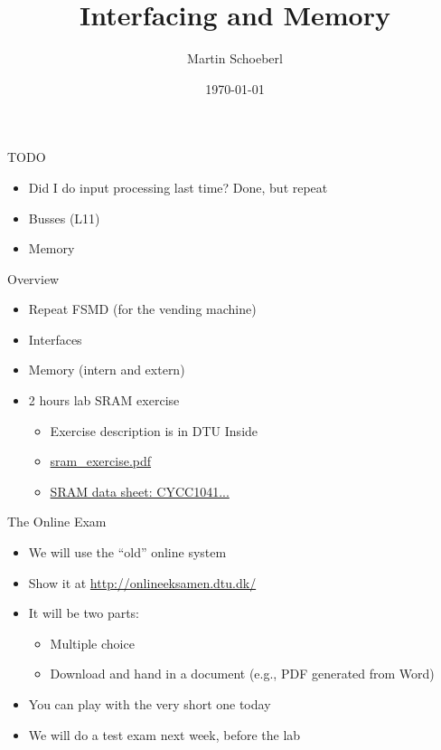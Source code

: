 

\newif\ifbook


\title{Interfacing and Memory}
\author{Martin Schoeberl}
\date{\today}



\begin{frame}
\titlepage
\end{frame}


\begin{frame}[fragile]{TODO}
\begin{itemize}
\item Did I do input processing last time? Done, but repeat
\item Busses (L11)
\item Memory
\end{itemize}
\end{frame}

\begin{frame}[fragile]{Overview}
\begin{itemize}
\item Repeat FSMD (for the vending machine)
\item Interfaces
\item Memory (intern and extern)
\item 2 hours lab SRAM exercise
\begin{itemize}
\item Exercise description is in DTU Inside
\item \href{https://cn.inside.dtu.dk/cnnet/filesharing/download/39a98e6a-f453-4aa7-98c4-cb13eae6c805}{sram\_exercise.pdf}
\item \href{https://cn.inside.dtu.dk/cnnet/filesharing/download/618360ca-01b4-42e4-86e2-765835963deb}{SRAM data sheet: CYCC1041...}
\end{itemize}
\end{itemize}
\end{frame}


\begin{frame}[fragile]{The Online Exam}
\begin{itemize}
\item We will use the ``old'' online system
\item Show it at \url{http://onlineeksamen.dtu.dk/}
\item It will be two parts:
\begin{itemize}
\item Multiple choice
\item Download and hand in a document (e.g., PDF generated from Word)
\end{itemize}
\item You can play with the very short one today
\item We will do a test exam next week, before the lab
\end{itemize}
\end{frame}

